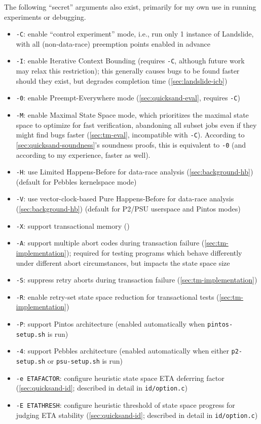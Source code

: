 The following ``secret'' arguments also exist, primarily for my own use in running experiments or debugging.

\begin{itemize}
	\item {\tt -C}: enable ``control experiment'' mode, i.e., run only 1 instance of Landslide, with all (non-data-race) preemption points enabled in advance
	\item {\tt -I}: enable Iterative Context Bounding (requires {\tt -C}, although future work may relax this restriction);
		this generally causes bugs to be found faster should they exist, but degrades completion time
		(\cref{sec:landslide-icb})
	\item {\tt -0}: enable Preempt-Everywhere mode (\cref{sec:quicksand-eval}, requires {\tt -C})
	\item {\tt -M}: enable Maximal State Space mode,
		which prioritizes the maximal state space to optimize for fast verification,
		abandoning all subset jobs even if they might find bugs faster
		(\cref{sec:tm-eval}, incompatible with {\tt -C}).
		According to \cref{sec:quicksand-soundness}'s soundness proofs,
		this is equivalent to {\tt -0}
		(and according to my experience,  faster as well).
	\item {\tt -H}: use Limited Happens-Before for data-race analysis (\cref{sec:background-hb})
		(default for Pebbles kernelspace mode)
	\item {\tt -V}: use vector-clock-based Pure Happens-Before for data-race analysis (\cref{sec:background-hb})
		(default for P2/PSU userspace and Pintos modes)
	\item {\tt -X}: support transactional memory ()
	\item {\tt -A}: support multiple abort codes during transaction failure (\cref{sec:tm-implementation});
		required for testing programs which behave differently under different abort circumstances,
		but impacts the state space size
	\item {\tt -S}: suppress retry aborts during transaction failure (\cref{sec:tm-implementation})
	\item {\tt -R}: enable retry-set state space reduction for transactional tests (\cref{sec:tm-implementation})
	\item {\tt -P}: support Pintos architecture (enabled automatically when {\tt pintos-setup.sh} is run)
	\item {\tt -4}: support Pebbles architecture (enabled automatically when either {\tt p2-setup.sh} or {\tt psu-setup.sh} is run)
	\item {\tt -e ETAFACTOR}: configure heuristic state space ETA deferring factor (\cref{sec:quicksand-id}; described in detail in {\tt id/option.c})
	\item {\tt -E ETATHRESH}: configure heuristic threshold of state space progress for judging ETA stability (\cref{sec:quicksand-id}; described in detail in {\tt id/option.c})
\end{itemize}

